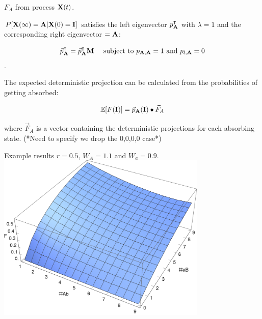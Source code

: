 \documentclass{beamer}
\begin{document}
\begin{frame}{$F_A$ from process $\bold{X}(t)$.}
    
    $P[\bold{X}(\infty) = \bold{A}| \bold{X}(0) = \bold{I}]$ satisfies the left eigenvector $p_\bold{A}^\intercal$ with $\lambda = 1$ and the corresponding right eigenvector $=\bold{A}$:
    
    \begin{equation*}
        \vec{p}_\bold{A}^\intercal = \vec{p}_\bold{A}^\intercal \bold{M} \ \ \ \  \text{subject to } p_{\bold{A},\bold{A}}=1 \ \text{and}\ p_{l,\bold{A}}=0
    \end{equation*}.
    
    The expected deterministic projection can be calculated from the probabilities of getting absorbed: 
    
    \begin{equation*}
        \mathbb{E}[F(\bold{I})] = \vec{p}_\bold{A}(\bold{I}) \bullet \vec{F}_A   %
    \end{equation*}
    
    where $\vec{F}_A$ is a vector containing the deterministic projections for each absorbing state. (*Need to specify we drop the {0,0,0,0} case*)
\end{frame}

\begin{frame}{Example results}
    $r=0.5$,  $W_A=1.1$ and $W_a=0.9$.
    \includegraphics[width=0.75\textwidth]{Matlab/Figures/Projection3DPlotr050.eps}
\end{frame}
\end{document}
